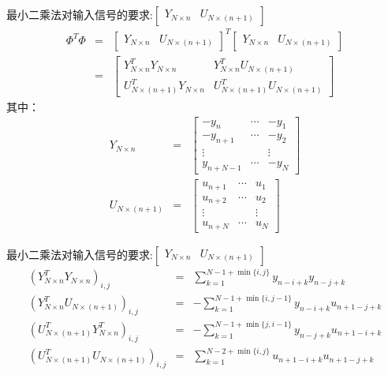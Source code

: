 \begin{frame}{最小二乘法对输入信号的要求:$\begin{bmatrix} Y_{N \times n} &  U_{N\times(n+1)}\end{bmatrix}$}
\begin{eqnarray*}
\Phi^T\Phi &=&\begin{bmatrix} Y_{N \times n} &  U_{N\times(n+1)}\end{bmatrix}^T\begin{bmatrix} Y_{N\times n} &  U_{N\times(n+1)}\end{bmatrix} \\
&=& \begin{bmatrix}
Y_{N \times n}^T Y_{N\times n}  & Y_{N \times n}^T U_{N\times(n+1)}  \\
U_{N\times(n+1)}^T Y_{N\times n}  &  U_{N\times(n+1)}^T U_{N\times(n+1)}
\end{bmatrix}
\end{eqnarray*}
其中：
\begin{eqnarray*}
Y_{N\times n} &=& 
\begin{bmatrix}
-y_{n}    & \cdots & -y_{1}    \\
-y_{n+1}  & \cdots & -y_{2}    \\
\vdots    &        & \vdots   \\
y_{n+N-1} & \cdots & -y_{N}  
\end{bmatrix} \\
U_{N\times(n+1)} &=&
\begin{bmatrix}
u_{n+1} & \cdots & u_{1} \\
u_{n+2} & \cdots & u_{2} \\
\vdots &         & \vdots \\
u_{n+N} & \cdots & u_{N} 
\end{bmatrix} 
\end{eqnarray*}
\end{frame}

\begin{frame}{最小二乘法对输入信号的要求:$\begin{bmatrix} Y_{N \times n} &  U_{N\times(n+1)}\end{bmatrix}$}
\begin{eqnarray*}
(Y_{N\times n}^T Y_{N\times n})_{i,j} &=& \sum_{k=1}^{N-1+\min\{i,j\}}y_{n-i+k}y_{n-j+k} \\
(Y_{N\times n}^T U_{N\times (n+1)})_{i,j} &=& -\sum_{k=1}^{N-1+\min\{i,j-1\}}y_{n-i+k}u_{n+1-j+k} \\
(U_{N\times (n+1)}^T Y_{N\times n}^T )_{i,j} &=& -\sum_{k=1}^{N-1+\min\{j,i-1\}}y_{n-j+k}u_{n+1-i+k} \\
(U_{N\times (n+1)}^T U_{N\times (n+1)})_{i,j} &=& \sum_{k=1}^{N-2+\min\{i,j\}}u_{n+1-i+k}u_{n+1-j+k}
\end{eqnarray*}
\end{frame}

